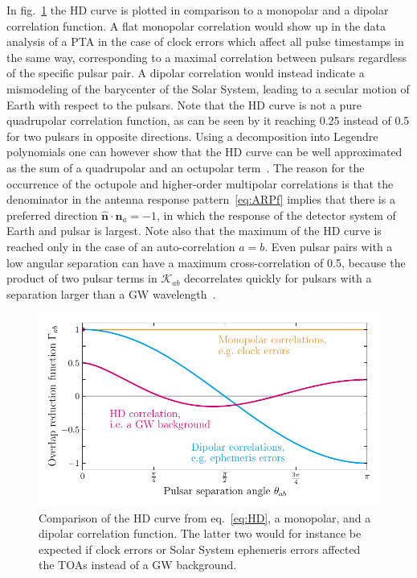 In fig.~\ref{fig:hd} the \ac{HD} curve is plotted in comparison to a monopolar and a dipolar correlation function. A flat monopolar correlation would show up in the data analysis of a \ac{PTA} in the case of clock errors which affect all pulse timestamps in the same way, corresponding to a maximal correlation between pulsars regardless of the specific pulsar pair. A dipolar correlation would instead indicate a mismodeling of the barycenter of the Solar System, leading to a secular motion of Earth with respect to the pulsars. Note that the \ac{HD} curve is not a pure quadrupolar correlation function,  as can be seen by it reaching 0.25 instead of 0.5 for two pulsars in opposite directions. Using a decomposition into Legendre polynomials one can however show that the \ac{HD} curve can be well approximated as the sum of a quadrupolar and an octupolar term~\cite{Taylor:2021yjx}. The reason for the occurrence of the octupole and higher-order multipolar correlations is that the denominator in the antenna response pattern~\eqref{eq:ARPf} implies that there is a preferred direction $\hat{\bm{n}} \cdot \hat{\bm{n}}_a = -1$, in which the response of the detector system of Earth and pulsar is largest. Note also that the maximum of the \ac{HD} curve is reached only in the case of an auto-correlation $a = b$. Even pulsar  pairs with a low angular separation can have a maximum cross-correlation of 0.5, because the product of two pulsar terms in $\mathcal{K}_{ab}$ decorrelates quickly for pulsars with a separation larger than a \ac{GW} wavelength~\cite{Mingarelli:2014xfa}.

\begin{figure}[t]
	\centering
	\includegraphics[width=\textwidth]{thesisplots/HD/HD}
	\caption{Comparison of the \ac{HD} curve from eq.~\eqref{eq:HD}, a monopolar, and a dipolar correlation function. The latter two would for instance be expected if clock errors or Solar System ephemeris errors affected the \acp{TOA} instead of a \ac{GW} background.}
	\label{fig:hd}
\end{figure}

